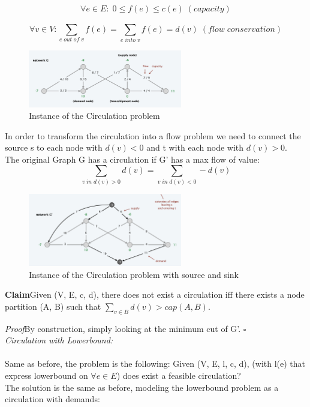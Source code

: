 \documentclass[11pt]{article}
\newenvironment{claim}[1]{\par\textbf{Claim}\space#1}{}
\newenvironment{proof}[1]{\par\textit{Proof}\space#1}{\hfill\ensuremath{\square}}
\begin{document}
\[ \forall e \in E: \; 0 \leq f(e) \leq c(e) \; (capacity)\] 

\[ \forall v \in V: \sum_{e \; out \; of \; v}^{} f(e) = \sum_{e \; into \; v}^{} f(e) = d(v) \; (flow \; conservation)\]

\begin{figure}[H]
		\centering
		\includegraphics[width=0.6\textwidth ]{circulation}
		\caption{Instance of the Circulation problem}
\end{figure}

In order to transform the circulation into a flow problem we need to connect the source s to each node with $d(v) < 0$ and t with each node with $d(v) > 0$.\\
The original Graph G has a circulation if G' has a max flow of value:
\[ \sum _{v \: in \; d(v) > 0 } d(v) = \sum _{v \; in \; d(v) < 0} - d(v)\]

\begin{figure}[H]
		\centering
		\includegraphics[width=0.6\textwidth ]{maxFlowCirculation}
		\caption{Instance of the Circulation problem with source and sink}
\end{figure}

\begin{claim}
Given (V, E, c, d), there does not exist a circulation iff there exists a node partition (A, B) such that $\sum _{v \in B} d(v) > cap(A, B).$
\end{claim}\\

\begin{proof}
By construction, simply looking at the minimum cut of G'.
\end{proof}\\

\emph{Circulation with Lowerbound:}\\\\
Same as before, the problem is the following: Given (V, E, l, c, d), (with l(e) that express lowerbound on $\forall e \in E$) does exist a feasible circulation?\\
The solution is the same as before, modeling the lowerbound problem as a circulation with demands:
\end{document}
